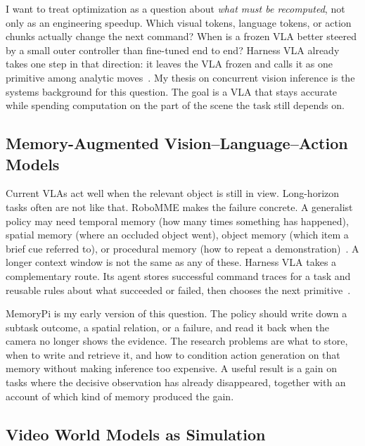 \documentclass[11pt]{article}
\begin{document}
I want to treat optimization as a question about \textit{what must be recomputed}, not only as an engineering speedup. Which visual tokens, language tokens, or action chunks actually change the next command? When is a frozen VLA better steered by a small outer controller than fine-tuned end to end? Harness VLA already takes one step in that direction: it leaves the VLA frozen and calls it as one primitive among analytic moves~\cite{zhang2026harness}. My thesis on concurrent vision inference is the systems background for this question. The goal is a VLA that stays accurate while spending computation on the part of the scene the task still depends on.

\subsection*{Memory-Augmented Vision--Language--Action Models}

Current VLAs act well when the relevant object is still in view. Long-horizon tasks often are not like that. RoboMME makes the failure concrete. A generalist policy may need temporal memory (how many times something has happened), spatial memory (where an occluded object went), object memory (which item a brief cue referred to), or procedural memory (how to repeat a demonstration)~\cite{dai2026robomme}. A longer context window is not the same as any of these. Harness VLA takes a complementary route. Its agent stores successful command traces for a task and reusable rules about what succeeded or failed, then chooses the next primitive~\cite{zhang2026harness}.

MemoryPi is my early version of this question. The policy should write down a subtask outcome, a spatial relation, or a failure, and read it back when the camera no longer shows the evidence. The research problems are what to store, when to write and retrieve it, and how to condition action generation on that memory without making inference too expensive. A useful result is a gain on tasks where the decisive observation has already disappeared, together with an account of which kind of memory produced the gain.

\subsection*{Video World Models as Simulation}
\end{document}
